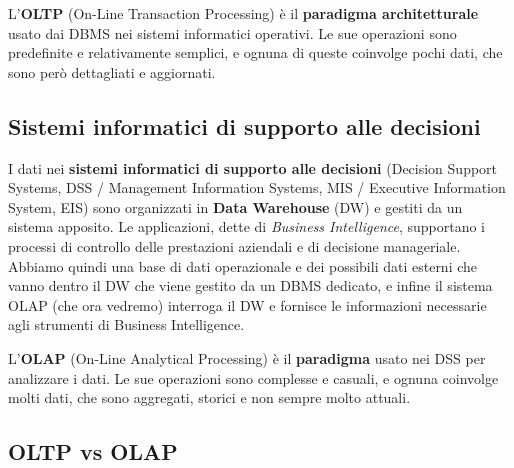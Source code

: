 \documentclass[11pt, a4paper, titlepage, oneside]{scrbook}
\begin{document}
\begin{Definizione}[OLTP]
\label{def-OLTP}
L'\textbf{OLTP} (On-Line Transaction Processing) è il \textbf{paradigma architetturale} usato dai DBMS nei sistemi informatici operativi. Le sue operazioni sono predefinite e relativamente semplici, e ognuna di queste coinvolge pochi dati, che sono però dettagliati e aggiornati.
\end{Definizione}

\subsection{Sistemi informatici di supporto alle decisioni}

I dati nei \textbf{sistemi informatici di supporto alle decisioni} (Decision Support Systems, DSS / Management Information Systems, MIS / Executive Information System, EIS) sono organizzati in \textbf{Data Warehouse} (DW) e gestiti da un sistema apposito. Le applicazioni, dette di \textit{Business Intelligence}, supportano i processi di controllo delle prestazioni aziendali e di decisione manageriale. Abbiamo quindi una base di dati operazionale e dei possibili dati esterni che vanno dentro il DW che viene gestito da un DBMS dedicato, e infine il sistema OLAP (che ora vedremo) interroga il DW e fornisce le informazioni necessarie agli strumenti di Business Intelligence.

\begin{Definizione}[OLAP]
\label{def-OLAP}
L'\textbf{OLAP} (On-Line Analytical Processing) è il \textbf{paradigma} usato nei DSS per analizzare i dati. Le sue operazioni sono complesse e casuali, e ognuna coinvolge molti dati, che sono aggregati, storici e non sempre molto attuali.  
\end{Definizione}

\subsection{OLTP vs OLAP}
\end{document}
